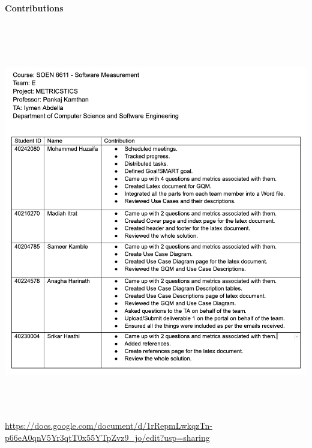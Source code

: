 \strut \\
    \textbf{\large Contributions}
    \strut \\

    \includegraphics[width=6in,height=6.5in]{METRICSTICS/media/Contributions.png}

    \url{https://docs.google.com/document/d/1rRepmLwkqzTn-p66eA0qnV5Yr3qtT0x55YTpZvz9_jo/edit?usp=sharing}
    \strut \\